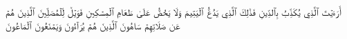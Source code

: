 أَرَءَيۡتَ ٱلَّذِي يُكَذِّبُ بِٱلدِّينِ
فَذَٰلِكَ ٱلَّذِي يَدُعُّ ٱلۡيَتِيمَ
وَلَا يَحُضُّ عَلَىٰ طَعَامِ ٱلۡمِسۡكِينِ
فَوَيۡلٞ لِّلۡمُصَلِّينَ
ٱلَّذِينَ هُمۡ عَن صَلَاتِهِمۡ سَاهُونَ
ٱلَّذِينَ هُمۡ يُرَآءُونَ
وَيَمۡنَعُونَ ٱلۡمَاعُونَ